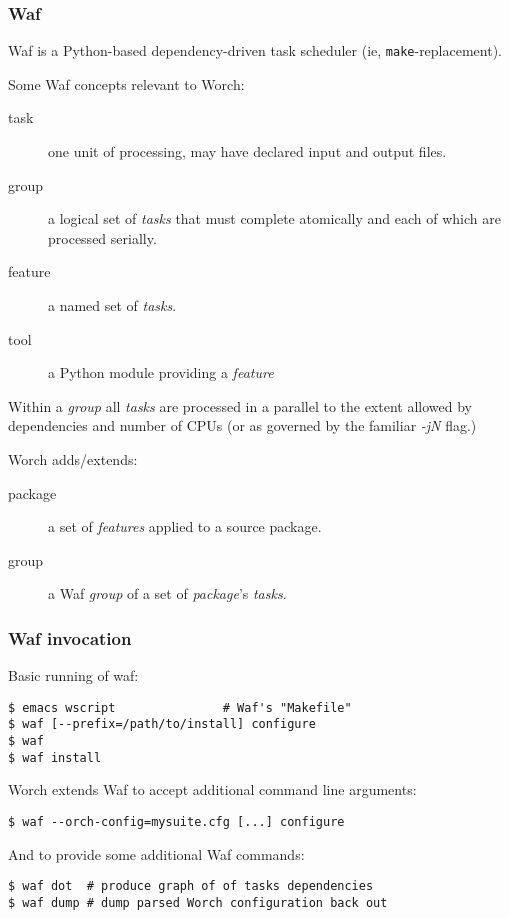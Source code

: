 \documentclass[xcolor=dvipsnames]{beamer}
\begin{document}
\begin{frame}
  \frametitle{Waf} 
  \footnotesize

  Waf is a Python-based dependency-driven task
  scheduler (ie, \texttt{make}-replacement).

  Some Waf concepts relevant to Worch:

  \begin{description}
  \item[task] one unit of processing, may have declared input and
    output files.
  \item[group] a logical set of \textit{tasks} that must complete
    atomically and each of which are processed serially.
  \item[feature] a named set of \textit{tasks}.
  \item[tool] a Python module providing a \textit{feature}
  \end{description}

  Within a \textit{group} all \textit{tasks} are processed in a
  parallel to the extent allowed by dependencies and number of CPUs
  (or as governed by the familiar \textit{-jN} flag.)

  \vspace{3mm}

  Worch adds/extends:
  \begin{description}
  \item[package] a set of \textit{features} applied to a source package.
    
  \item[group] a Waf \textit{group} of a set of \textit{package}'s
    \textit{tasks}.
  \end{description}

\end{frame}

\begin{frame}[fragile]
  \frametitle{Waf invocation}
Basic running of waf:
\begin{verbatim}
$ emacs wscript               # Waf's "Makefile"
$ waf [--prefix=/path/to/install] configure
$ waf
$ waf install
\end{verbatim}

Worch extends Waf to accept additional command line arguments:

\begin{verbatim}
$ waf --orch-config=mysuite.cfg [...] configure
\end{verbatim}

And to provide some additional Waf commands:

\begin{verbatim}
$ waf dot  # produce graph of of tasks dependencies
$ waf dump # dump parsed Worch configuration back out
\end{verbatim}

\end{frame}
\end{document}
